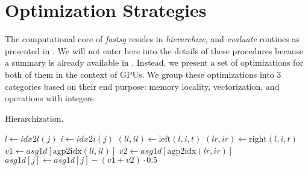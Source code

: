 \section{Optimization Strategies}

The computational core of \textit{fastsg} resides in \textit{hierarchize}, and
\textit{evaluate} routines as presented in \cite{}. We will not enter here into
the details of these procedures because a summary is already available in
\cite{murarasu2011}. Instead, we present a set of optimizations for both of them
in the context of GPUs. We group these optimizations into 3 categories based
on their end purpose: memory locality, vectorization, and operations with
integers.

\begin{algorithm}[tbp]
\small{
	\caption{Hierarchization.}
 	\label{alg:hierarchization}                       

 	\begin{algorithmic}[1]
 				\State {}
 			\EndFor
 		\EndFor
	\end{algorithmic}
 
	\begin{algorithmic}[1]
	 				\State $l \leftarrow idx2l(j)$
	 			\EndIf
	 			\State $i \leftarrow idx2i(j)$
	 			\State $(\textit{ll}, \textit{il}) \leftarrow \text{left}(l, i, t)$
	 			\State $(\textit{lr}, \textit{ir}) \leftarrow \text{right}(l, i, t)$
	 			\State $\textit{v1} \leftarrow \textit{asg1d}[\text{agp2idx}(\textit{ll},
	 			\textit{il})]$ \State $\textit{v2} \leftarrow
	 			\textit{asg1d}[\text{agp2idx}(\textit{lr}, \textit{ir})]$ \State$\textit{asg1d}[j] \leftarrow \textit{asg1d}[j] - (\textit{v1} +\textit{v2}) \cdot 0.5$
			\EndFor
		\EndProcedure
	\end{algorithmic}
}
\end{algorithm}

